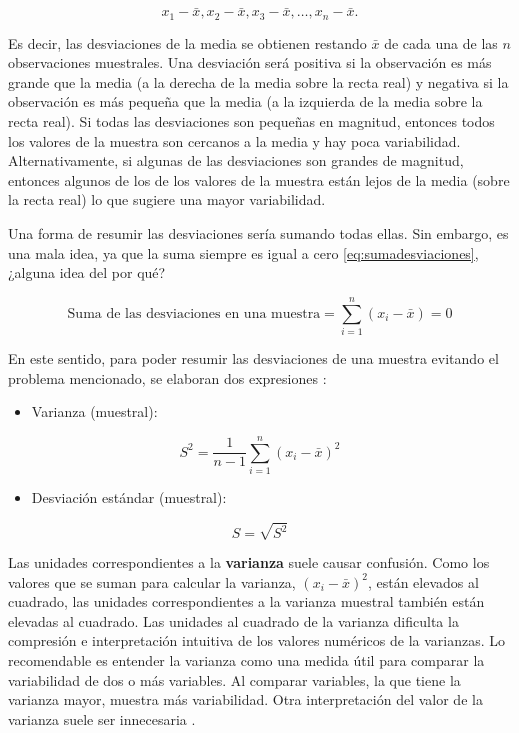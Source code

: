 \documentclass[
  11pt,
]{book}
\providecommand{\tightlist}{%
  \setlength{\itemsep}{0pt}\setlength{\parskip}{0pt}}
\theoremstyle{definition}
\theoremstyle{definition}
\theoremstyle{definition}
\theoremstyle{definition}
\theoremstyle{remark}
\begin{document}
\begin{equation}
x_1 - \bar{x}, x_2 - \bar{x}, x_3 - \bar{x}, \ldots, x_n - \bar{x}.
\label{eq:desviaciones}
\end{equation}

Es decir, las desviaciones de la media se obtienen restando \(\bar{x}\) de cada una de las \(n\) observaciones muestrales. Una desviación será positiva si la observación es más grande que la media (a la derecha de la media sobre la recta real) y negativa si la observación es más pequeña que la media (a la izquierda de la media sobre la recta real). Si todas las desviaciones son pequeñas en magnitud, entonces todos los valores de la muestra son cercanos a la media y hay poca variabilidad. Alternativamente, si algunas de las desviaciones son grandes de magnitud, entonces algunos de los de los valores de la muestra están lejos de la media (sobre la recta real) lo que sugiere una mayor variabilidad.

Una forma de resumir las desviaciones sería sumando todas ellas. Sin embargo, es una mala idea, ya que la suma siempre es igual a cero \eqref{eq:sumadesviaciones}, ¿alguna idea del por qué?

\begin{equation}
\text{Suma de las desviaciones en una muestra} = \sum_{i=1}^{n}(x_i-\bar{x}) = 0
\label{eq:sumadesviaciones}
\end{equation}

En este sentido, para poder resumir las desviaciones de una muestra evitando el problema mencionado, se elaboran dos expresiones \citep[página 32]{Devore}:

\begin{itemize}
\tightlist
\item
  Varianza (muestral):
\end{itemize}

\begin{equation}
S^2= \frac{1}{n-1}\sum_{i=1}^{n}(x_i-\bar{x})^2
\label{eq:varianzamuestral}
\end{equation}

\begin{itemize}
\tightlist
\item
  Desviación estándar (muestral):
\end{itemize}

\begin{equation}
S = \sqrt{S^2}
\label{eq:demuestral}
\end{equation}

Las unidades correspondientes a la \textbf{varianza} suele causar confusión. Como los valores que se suman para calcular la varianza, \((x_i-\bar{x})^2\), están elevados al cuadrado, las unidades correspondientes a la varianza muestral también están elevadas al cuadrado. Las unidades al cuadrado de la varianza dificulta la compresión e interpretación intuitiva de los valores numéricos de la varianzas. Lo recomendable es entender la varianza como una medida útil para comparar la variabilidad de dos o más variables. Al comparar variables, la que tiene la varianza mayor, muestra más variabilidad. Otra interpretación del valor de la varianza suele ser innecesaria \citep[página 94]{anderson}.
\end{document}
